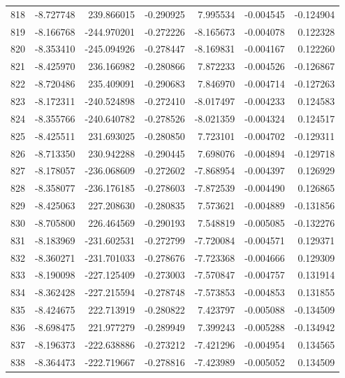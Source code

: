 \begin{tabular}{rrrrrrr}
 818 &  -8.727748 &  239.866015 & -0.290925 &    7.995534 &   -0.004545 & -0.124904 \\
 819 &  -8.166768 & -244.970201 & -0.272226 &   -8.165673 &   -0.004078 &  0.122328 \\
 820 &  -8.353410 & -245.094926 & -0.278447 &   -8.169831 &   -0.004167 &  0.122260 \\
 821 &  -8.425970 &  236.166982 & -0.280866 &    7.872233 &   -0.004526 & -0.126867 \\
 822 &  -8.720486 &  235.409091 & -0.290683 &    7.846970 &   -0.004714 & -0.127263 \\
 823 &  -8.172311 & -240.524898 & -0.272410 &   -8.017497 &   -0.004233 &  0.124583 \\
 824 &  -8.355766 & -240.640782 & -0.278526 &   -8.021359 &   -0.004324 &  0.124517 \\
 825 &  -8.425511 &  231.693025 & -0.280850 &    7.723101 &   -0.004702 & -0.129311 \\
 826 &  -8.713350 &  230.942288 & -0.290445 &    7.698076 &   -0.004894 & -0.129718 \\
 827 &  -8.178057 & -236.068609 & -0.272602 &   -7.868954 &   -0.004397 &  0.126929 \\
 828 &  -8.358077 & -236.176185 & -0.278603 &   -7.872539 &   -0.004490 &  0.126865 \\
 829 &  -8.425063 &  227.208630 & -0.280835 &    7.573621 &   -0.004889 & -0.131856 \\
 830 &  -8.705800 &  226.464569 & -0.290193 &    7.548819 &   -0.005085 & -0.132276 \\
 831 &  -8.183969 & -231.602531 & -0.272799 &   -7.720084 &   -0.004571 &  0.129371 \\
 832 &  -8.360271 & -231.701033 & -0.278676 &   -7.723368 &   -0.004666 &  0.129309 \\
 833 &  -8.190098 & -227.125409 & -0.273003 &   -7.570847 &   -0.004757 &  0.131914 \\
 834 &  -8.362428 & -227.215594 & -0.278748 &   -7.573853 &   -0.004853 &  0.131855 \\
 835 &  -8.424675 &  222.713919 & -0.280822 &    7.423797 &   -0.005088 & -0.134509 \\
 836 &  -8.698475 &  221.977279 & -0.289949 &    7.399243 &   -0.005288 & -0.134942 \\
 837 &  -8.196373 & -222.638886 & -0.273212 &   -7.421296 &   -0.004954 &  0.134565 \\
 838 &  -8.364473 & -222.719667 & -0.278816 &   -7.423989 &   -0.005052 &  0.134509 \\

\end{tabular}

